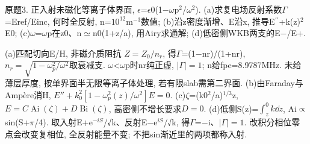 \begin{exercise}\label{ex:06-7-3}
原题3. 正入射未磁化等离子体界面, \ensuremath{\epsilon}=\ensuremath{\epsilon}0(1\ensuremath{-}\ensuremath{\omega}p\ensuremath{{}^{2}}/\ensuremath{\omega}\ensuremath{{}^{2}}). (a)求复电场反射系数\ensuremath{\Gamma}=Eref/Einc, 何时全反射, n=$10^{12}$m$^{-3}$数值; (b)沿z密度渐增、E沿x, 推导E\ensuremath{{}^{\prime\prime}}+k(z)\ensuremath{{}^{2}}E0; (c)\ensuremath{\omega}=\ensuremath{\omega}p在z0、n\ensuremath{\simeq}n0(1+z/a), 用Airy求通解; (d)低密侧WKB两支的E\ensuremath{-}/E+.
\end{exercise}
\begin{solution}
(a)匹配切向E/H, 非磁介质阻抗 $Z=Z_0/n_r$, 得\ensuremath{\Gamma}=(1\ensuremath{-}nr)/(1+nr), $n_r=\sqrt{1-\omega_p^2/\omega^2}$取衰减支. \ensuremath{\omega}<\ensuremath{\omega}p时nr纯正虚, $|\Gamma|=1$; n给fpe=8.9787MHz. 未给薄层厚度, 按单界面半无限等离子体处理, 若有限slab需第二界面.
(b)由Faraday与Amp\`ere消H, $E''+k_0^2[1-\omega_p^2(z)/\omega^2]E=0$. (c)\ensuremath{\zeta}=(k0\ensuremath{{}^{2}}/a)$^{1/3}$z, $E=C\operatorname{Ai}(\zeta)+D\operatorname{Bi}(\zeta)$, 高密侧不增长要求$D=0$. (d)低侧S(z)=$\int_z^0k\dd z$, Ai\ensuremath{\propto}sin(S+\ensuremath{\pi}/4). 取入射E+e$^{-iS}$/√k、反射E\ensuremath{-}e$^{iS}$/√k, 得\ensuremath{\Gamma}=\ensuremath{-}i、$|\Gamma|=1$. 改积分相位零点会改变复相位, 全反射能量不变; 不把sin渐近里的两项都称入射.
\end{solution}
